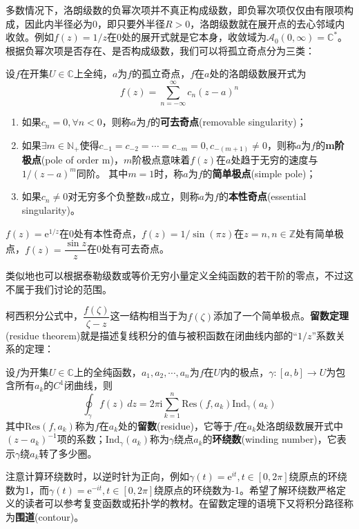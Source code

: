 多数情况下，洛朗级数的负幂次项并不真正构成级数，即负幂次项仅仅由有限项构成，因此内半径必为0，即只要外半径$R>0$，洛朗级数就在展开点的去心邻域内收敛。例如$f(z)=1/z$在0处的展开式就是它本身，收敛域为$\mathcal{A}_0(0,\infty)=\mathbb{C}^*$。根据负幂次项是否存在、是否构成级数，我们可以将孤立奇点分为三类：
\begin{definition}[孤立奇点的分类]
    设$f$在开集$U\in\mathbb{C}$上全纯，$a$为$f$的孤立奇点，$f$在$a$处的洛朗级数展开式为
    \[f(z)=\sum_{n=-\infty}^{\infty}c_n(z-a)^n\]
    \begin{enumerate}
        \item 如果$c_n=0,\forall n<0$，则称$a$为$f$的\textbf{可去奇点}(removable singularity)；
        \item 如果$\exists m\in\mathbb{N}_+$使得$c_{-1}=c_{-2}=\cdots=c_{-m}=0,c_{-(m+1)}\neq 0$，则称$a$为$f$的\textbf{m阶极点}(pole of order m)，$m$阶极点意味着$f(z)$在$a$处趋于无穷的速度与$1/(z-a)^m$同阶。
        其中$m=1$时，称$a$为$f$的\textbf{简单极点}(simple pole)；
        \item 如果$c_n\neq 0$对无穷多个负整数$n$成立，则称$a$为$f$的\textbf{本性奇点}(essential singularity)。
    \end{enumerate}
\end{definition}
\begin{example}
$f(z)=\mathrm{e}^{1/z}$在0处有本性奇点，$f(z)=1/\sin(\pi z)$在$z=n,n\in\mathbb{Z}$处有简单极点，$f(z)=\dfrac{\sin z}{z}$在0处有可去奇点。
\end{example}

类似地也可以根据泰勒级数或等价无穷小量定义全纯函数的若干阶的零点，不过这不属于我们讨论的范围。

柯西积分公式中，$\dfrac{f(\zeta)}{\zeta-z}$这一结构相当于为$f(\zeta)$添加了一个简单极点。\textbf{留数定理}(residue theorem)就是描述复线积分的值与被积函数在闭曲线内部的“$1/z$”系数关系的定理：
\begin{theorem}[留数定理]
    设$f$为开集$U\in\mathbb{C}$上的全纯函数，$a_1,a_2,\cdots,a_n$为$f$在$U$内的极点，$\gamma:[a,b]\to U$为包含所有$a_k$的$C^1$闭曲线，则
    \[\oint_{\gamma}f(z)\,dz=2\pi \mathrm{i}\sum_{k=1}^{n}\text{Res}(f,a_k)\text{Ind}_{\gamma}(a_k)\]
    其中$\text{Res}(f,a_k)$称为$f$在$a_k$处的\textbf{留数}(residue)，它等于$f$在$a_k$处洛朗级数展开式中$(z-a_k)^{-1}$项的系数；$\text{Ind}_{\gamma}(a_k)$称为$\gamma$绕点$a_k$的\textbf{环绕数}(winding number)，它表示$\gamma$绕$a_k$转了多少圈。
\end{theorem}
注意计算环绕数时，以逆时针为正向，例如$\gamma(t)=\mathrm{e}^{it},t\in[0,2\pi]$绕原点的环绕数为1，而$\gamma(t)=\mathrm{e}^{-it},t\in[0,2\pi]$绕原点的环绕数为-1。希望了解环绕数严格定义的读者可以参考复变函数或拓扑学的教材。在留数定理的语境下又将积分路径称为\textbf{围道}(contour)。

